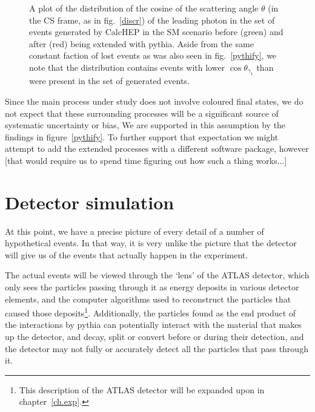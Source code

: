 \begin{figure}[htp]
\begin{minipage}[b]{.65\textwidth}
\begin{infilsf} \tiny \makebox[0pt][l]{
\hspace{-1em}
}\end{infilsf}
\end{minipage}
\hfill\begin{minipage}[b]{.3\textwidth}
\caption{A plot of the distribution of the cosine of the scattering angle $\theta$ (in the CS frame, as in fig.~\ref{discr}) of the leading photon in the set of events generated by CalcHEP in the SM scenario before (green) and after (red) being extended with pythia. Aside from the same constant faction of lost events as was also seen in fig.~\ref{pythify}, we note that the distribution contains events with lower $\cos\theta_{\gamma_1}$ than were present in the set of generated events.
\label{pythicos}}
\end{minipage}
\end{figure}

Since the main process under study does not involve coloured final states, we do not expect that these surrounding processes will be a significant source of systematic uncertainty or bias, We are supported in this assumption by the findings in figure~\ref{pythify}. To further support that expectation we might attempt to add the extended processes with a different software package, however [that would require us to spend time figuring out how such a thing works...]

\section{Detector simulation}
At this point, we have a precise picture of every detail of a number of hypothetical events. In that way, it is very unlike the picture that the detector will give us of the events that actually happen in the experiment.

The actual events will be viewed through the `lens' of the ATLAS detector, which only sees the particles passing through it as energy deposits in various detector elements, and the computer algorithms used to reconstruct the particles that caused those deposits\footnote{This description of the ATLAS detector will be expanded upon in chapter~\ref{ch.exp}.}. Additionally, the particles found as the end product of the interactions by pythia can potentially interact with the material that makes up the detector, and decay, split or convert before or during their detection, and the detector may not fully or accurately detect all the particles that pass through it.

